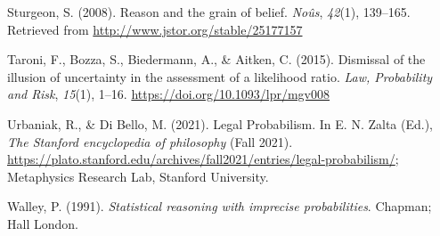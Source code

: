 \documentclass[
  10pt,
  dvipsnames,enabledeprecatedfontcommands]{scrartcl}
\newlength{\cslhangindent}
\newlength{\cslentryspacingunit} %
\newenvironment{CSLReferences}[2] %
 {%
  \setlength{\parindent}{0pt}
  \ifodd #1
  \let\oldpar\par
  \def\par{\hangindent=\cslhangindent\oldpar}
  \fi
  \setlength{\parskip}{#2\cslentryspacingunit}
 }%
 {}
\begin{document}
\begin{CSLReferences}{1}{0}
\leavevmode{}%
Sturgeon, S. (2008). Reason and the grain of belief. \emph{No{û}s},
\emph{42}(1), 139--165. Retrieved from
\url{http://www.jstor.org/stable/25177157}

\leavevmode{}%
Taroni, F., Bozza, S., Biedermann, A., \& Aitken, C. (2015). {Dismissal
of the illusion of uncertainty in the assessment of a likelihood ratio}.
\emph{Law, Probability and Risk}, \emph{15}(1), 1--16.
\url{https://doi.org/10.1093/lpr/mgv008}

\leavevmode{}%
Urbaniak, R., \& Di Bello, M. (2021). {Legal Probabilism}. In E. N.
Zalta (Ed.), \emph{The {Stanford} encyclopedia of philosophy} (Fall
2021).
\url{https://plato.stanford.edu/archives/fall2021/entries/legal-probabilism/};
Metaphysics Research Lab, Stanford University.

\leavevmode{}%
Walley, P. (1991). \emph{Statistical reasoning with imprecise
probabilities}. Chapman; Hall London.

\end{CSLReferences}
\end{document}
